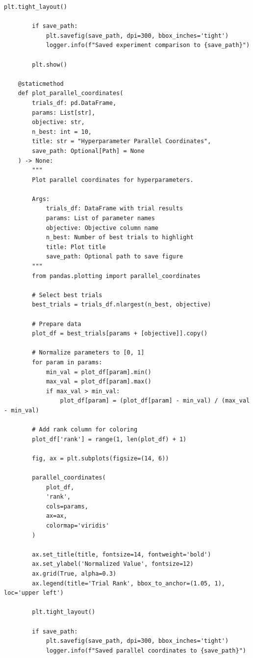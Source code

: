 \begin{lstlisting}[style=python, caption={Experiment dashboard generation}]
        plt.tight_layout()

        if save_path:
            plt.savefig(save_path, dpi=300, bbox_inches='tight')
            logger.info(f"Saved experiment comparison to {save_path}")

        plt.show()

    @staticmethod
    def plot_parallel_coordinates(
        trials_df: pd.DataFrame,
        params: List[str],
        objective: str,
        n_best: int = 10,
        title: str = "Hyperparameter Parallel Coordinates",
        save_path: Optional[Path] = None
    ) -> None:
        """
        Plot parallel coordinates for hyperparameters.

        Args:
            trials_df: DataFrame with trial results
            params: List of parameter names
            objective: Objective column name
            n_best: Number of best trials to highlight
            title: Plot title
            save_path: Optional path to save figure
        """
        from pandas.plotting import parallel_coordinates

        # Select best trials
        best_trials = trials_df.nlargest(n_best, objective)

        # Prepare data
        plot_df = best_trials[params + [objective]].copy()

        # Normalize parameters to [0, 1]
        for param in params:
            min_val = plot_df[param].min()
            max_val = plot_df[param].max()
            if max_val > min_val:
                plot_df[param] = (plot_df[param] - min_val) / (max_val - min_val)

        # Add rank column for coloring
        plot_df['rank'] = range(1, len(plot_df) + 1)

        fig, ax = plt.subplots(figsize=(14, 6))

        parallel_coordinates(
            plot_df,
            'rank',
            cols=params,
            ax=ax,
            colormap='viridis'
        )

        ax.set_title(title, fontsize=14, fontweight='bold')
        ax.set_ylabel('Normalized Value', fontsize=12)
        ax.grid(True, alpha=0.3)
        ax.legend(title='Trial Rank', bbox_to_anchor=(1.05, 1), loc='upper left')

        plt.tight_layout()

        if save_path:
            plt.savefig(save_path, dpi=300, bbox_inches='tight')
            logger.info(f"Saved parallel coordinates to {save_path}")


\end{lstlisting}
